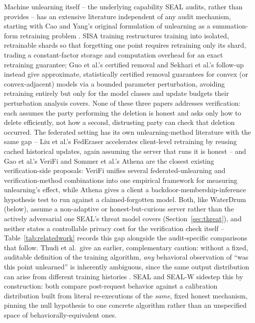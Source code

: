 \documentclass[10pt,journal,compsoc]{IEEEtran}
\begin{document}
Machine unlearning itself -- the underlying capability SEAL audits, rather than provides -- has an extensive literature independent of any audit mechanism, starting with Cao and Yang's original formulation of unlearning as a summation-form retraining problem \cite{cao2015towards}. SISA training \cite{bourtoule2021sisa} restructures training into isolated, retrainable shards so that forgetting one point requires retraining only its shard, trading a constant-factor storage and computation overhead for an exact retraining guarantee; Guo et al.'s certified removal \cite{guo2020certified} and Sekhari et al.'s follow-up \cite{sekhari2021remember} instead give approximate, statistically certified removal guarantees for convex (or convex-adjacent) models via a bounded parameter perturbation, avoiding retraining entirely but only for the model classes and update budgets their perturbation analysis covers. None of these three papers addresses verification: each assumes the party performing the deletion is honest and asks only how to delete efficiently, not how a second, distrusting party can check that deletion occurred. The federated setting has its own unlearning-method literature with the same gap -- Liu et al.'s FedEraser \cite{liu2021federaser} accelerates client-level retraining by reusing cached historical updates, again assuming the server that runs it is honest -- and Gao et al.'s VeriFi \cite{gao2024verifi} and Sommer et al.'s Athena \cite{sommer2022athena} are the closest existing verification-side proposals: VeriFi unifies several federated-unlearning and verification-method combinations into one empirical framework for measuring unlearning's effect, while Athena gives a client a backdoor-membership-inference hypothesis test to run against a claimed-forgotten model. Both, like WaterDrum (below), assume a non-adaptive or honest-but-curious server rather than the actively adversarial one SEAL's threat model covers (Section~\ref{sec:threat}), and neither states a controllable privacy cost for the verification check itself -- Table~\ref{tab:relatedwork} records this gap alongside the audit-specific comparisons that follow. Thudi et al.\ give an earlier, complementary caution: without a fixed, auditable definition of the training algorithm, \emph{any} behavioral observation of ``was this point unlearned'' is inherently ambiguous, since the same output distribution can arise from different training histories \cite{thudi2022necessity}. SEAL and SEAL-W sidestep this by construction: both compare post-request behavior against a calibration distribution built from literal re-executions of the \emph{same}, fixed honest mechanism, pinning the null hypothesis to one concrete algorithm rather than an unspecified space of behaviorally-equivalent ones.
\end{document}
